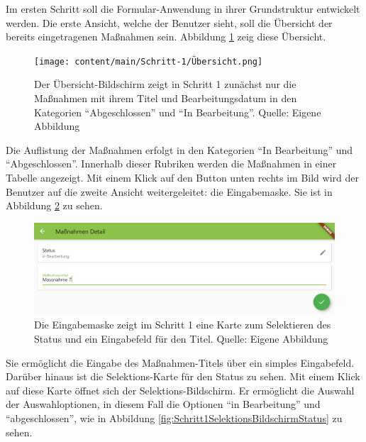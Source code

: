 

Im ersten Schritt soll die Formular-Anwendung  in ihrer Grundstruktur entwickelt werden. Die erste Ansicht, welche der Benutzer sieht, soll die Übersicht der bereits eingetragenen Maßnahmen sein. Abbildung \ref{fig:Schritt1Uebersicht} zeig diese Übersicht. 
\begin{figure}[H]
	\centering
    \texttt{[image: content/main/Schritt-1/Übersicht.png]}
	\caption[Schritt 1 Übersicht]{Der Übersicht-Bildschirm zeigt in  Schritt 1 zunächst nur die Maßnahmen mit ihrem Titel und Bearbeitungsdatum in den Kategorien \enquote{Abgeschlossen} und \enquote{In Bearbeitung}. Quelle: Eigene Abbildung}
	\label{fig:Schritt1Uebersicht}
\end{figure} 
Die Auflistung der Maßnahmen erfolgt in den Kategorien \enquote{In Bearbeitung} und \enquote{Abgeschlossen}. Innerhalb dieser Rubriken werden die Maßnahmen in einer Tabelle angezeigt. Mit einem Klick auf den Button unten rechts im Bild wird der Benutzer auf die zweite Ansicht weitergeleitet: die Eingabemaske. Sie ist in Abbildung \ref{fig:Schritt1Eingabemaske} zu sehen.
\begin{figure}[H]
	\centering
    \includegraphics[width=1.0\textwidth]{content/main/Schritt-1/Eingabemaske.png}
	\caption[Schritt 1 Eingabemaske]{Die Eingabemaske zeigt im Schritt 1 eine Karte zum Selektieren des Status und ein Eingabefeld für den Titel. Quelle: Eigene Abbildung}
	\label{fig:Schritt1Eingabemaske}
\end{figure} 
Sie ermöglicht die Eingabe des Maßnahmen-Titels über ein simples Eingabefeld. Darüber hinaus ist die Selektions-Karte für den Status zu sehen. Mit einem Klick auf diese Karte öffnet sich der Selektions-Bildschirm. Er ermöglicht die Auswahl der Auswahloptionen, in diesem Fall die Optionen \enquote{in Bearbeitung} und \enquote{abgeschlossen}, wie in Abbildung \ref{fig:Schritt1SelektionsBildschirmStatus} zu sehen.

